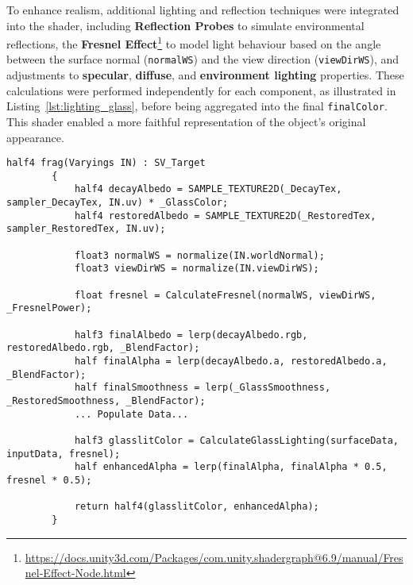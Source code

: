 To enhance realism, additional lighting and reflection techniques were integrated into the shader, including 
\textbf{Reflection Probes} to simulate environmental reflections, 
the \textbf{Fresnel Effect}\footnote{\url{https://docs.unity3d.com/Packages/com.unity.shadergraph@6.9/manual/Fresnel-Effect-Node.html}} to model light behaviour based on the angle between the surface normal (\texttt{normalWS}) and the view direction (\texttt{viewDirWS}), 
and adjustments to \textbf{specular}, \textbf{diffuse}, and \textbf{environment lighting} properties. 
These calculations were performed independently for each component, as illustrated in Listing~\ref{lst:lighting_glass}, before being aggregated into the final \texttt{finalColor}. 
This shader enabled a more faithful representation of the object's original appearance.

\begin{lstlisting}[language=HLSL, caption={Partial Fragment shader for blending original and restored textures.}, label={lst:shader_blend}]
        half4 frag(Varyings IN) : SV_Target
        {
            half4 decayAlbedo = SAMPLE_TEXTURE2D(_DecayTex, sampler_DecayTex, IN.uv) * _GlassColor;
            half4 restoredAlbedo = SAMPLE_TEXTURE2D(_RestoredTex, sampler_RestoredTex, IN.uv);

            float3 normalWS = normalize(IN.worldNormal);
            float3 viewDirWS = normalize(IN.viewDirWS);

            float fresnel = CalculateFresnel(normalWS, viewDirWS, _FresnelPower);

            half3 finalAlbedo = lerp(decayAlbedo.rgb, restoredAlbedo.rgb, _BlendFactor);
            half finalAlpha = lerp(decayAlbedo.a, restoredAlbedo.a, _BlendFactor);
            half finalSmoothness = lerp(_GlassSmoothness, _RestoredSmoothness, _BlendFactor);
            ... Populate Data...
            
            half3 glasslitColor = CalculateGlassLighting(surfaceData, inputData, fresnel);            
            half enhancedAlpha = lerp(finalAlpha, finalAlpha * 0.5, fresnel * 0.5);
            
            return half4(glasslitColor, enhancedAlpha);
        }
\end{lstlisting}



